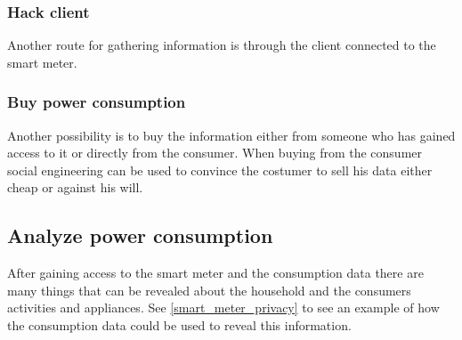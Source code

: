 \subsubsection{Hack client}
Another route for gathering information is through the client connected to the smart meter.

\subsubsection{Buy power consumption}
Another possibility is to buy the information either from someone who has gained access to it or directly from the consumer.
When buying from the consumer social engineering can be used to convince the costumer to sell his data either cheap or against his will.

\subsection{Analyze power consumption}
After gaining access to the smart meter and the consumption data there are many things that can be revealed about the household and the consumers activities and appliances.
See \cref{smart_meter_privacy} to see an example of how the consumption data could be used to reveal this information.
